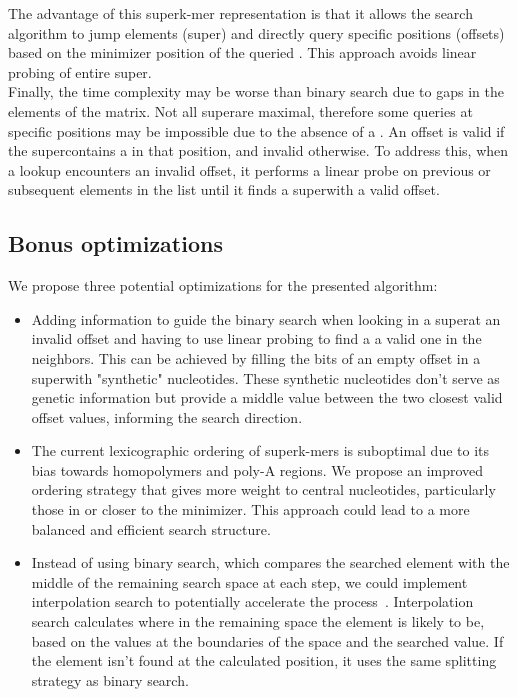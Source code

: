 The advantage of this superk-mer representation is that it allows the search algorithm to jump elements (super\kmers) and directly query specific positions (offsets) based on the minimizer position of the queried \kmer. This approach avoids linear probing of entire super\kmers.\\
Finally, the time complexity may be worse than binary search due to gaps in the elements of the matrix. Not all super\kmers are maximal, therefore some queries at specific positions may be impossible due to the absence of a \kmer. An offset is valid if the super\kmer contains a \kmer in that position, and invalid otherwise. To address this, when a lookup encounters an invalid offset, it performs a linear probe on previous or subsequent elements in the list until it finds a super\kmer with a valid offset.

\subsection{Bonus optimizations}
We propose three potential optimizations for the presented algorithm:
\begin{itemize}
	\item Adding information to guide the binary search when looking in a super\kmer at an invalid offset and having to use linear probing to find a a valid one in the neighbors. This can be achieved by filling the bits of an empty offset in a super\kmer with "synthetic" nucleotides. These synthetic nucleotides don't serve as genetic information but provide a middle value between the two closest valid offset values, informing the search direction.
	\item The current lexicographic ordering of superk-mers is suboptimal due to its bias towards homopolymers and poly-A regions. We propose an improved ordering strategy that gives more weight to central nucleotides, particularly those in or closer to the minimizer. This approach could lead to a more balanced and efficient search structure.
	\item Instead of using binary search, which compares the searched element with the middle of the remaining search space at each step, we could implement interpolation search to potentially accelerate the process~\cite{pla_complexity}. Interpolation search calculates where in the remaining space the element is likely to be, based on the values at the boundaries of the space and the searched value. If the element isn't found at the calculated position, it uses the same splitting strategy as binary search.
	
\end{itemize}

